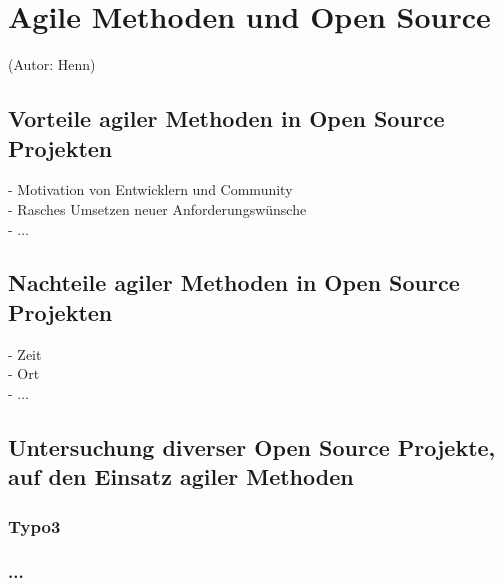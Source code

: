 \section{Agile Methoden und Open Source}
(Autor: Henn)\\

\subsection{Vorteile agiler Methoden in Open Source Projekten}
  - Motivation von Entwicklern und Community\\
  - Rasches Umsetzen neuer Anforderungswünsche\\
  - ...
  
\subsection{Nachteile agiler Methoden in Open Source Projekten}
  - Zeit\\
  - Ort\\
  - ...
  
\subsection{Untersuchung diverser Open Source Projekte, auf den Einsatz agiler Methoden}

\subsubsection{Typo3}

\subsubsection{...}


